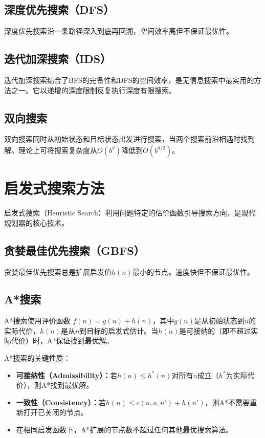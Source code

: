\subsection{深度优先搜索（DFS）}

深度优先搜索沿一条路径深入到底再回溯，空间效率高但不保证最优性。

\subsection{迭代加深搜索（IDS）}

迭代加深搜索结合了BFS的完备性和DFS的空间效率，是无信息搜索中最实用的方法之一。它以递增的深度限制反复执行深度有限搜索。

\subsection{双向搜索}

双向搜索同时从初始状态和目标状态出发进行搜索，当两个搜索前沿相遇时找到解。理论上可将搜索复杂度从$O(b^d)$降低到$O(b^{d/2})$。

\section{启发式搜索方法 \ug}

启发式搜索（Heuristic Search）利用问题特定的估价函数引导搜索方向，是现代规划器的核心技术。

\subsection{贪婪最佳优先搜索（GBFS）}

贪婪最佳优先搜索总是扩展启发值$h(n)$最小的节点。速度快但不保证最优性。

\subsection{A*搜索}

\begin{definition}[A*搜索]
A*搜索使用评价函数 $f(n) = g(n) + h(n)$，其中$g(n)$是从初始状态到$n$的实际代价，$h(n)$是从$n$到目标的启发式估计。当$h(n)$是可接纳的（即不超过实际代价）时，A*保证找到最优解。
\end{definition}

\begin{keypoint}
A*搜索的关键性质：
\begin{itemize}
  \item \textbf{可接纳性（Admissibility）：}若$h(n) \leq h^*(n)$对所有$n$成立（$h^*$为实际代价），则A*找到最优解。
  \item \textbf{一致性（Consistency）：}若$h(n) \leq c(n,a,n') + h(n')$，则A*不需要重新打开已关闭的节点。
  \item 在相同启发函数下，A*扩展的节点数不超过任何其他最优搜索算法。
\end{itemize}
\end{keypoint}


